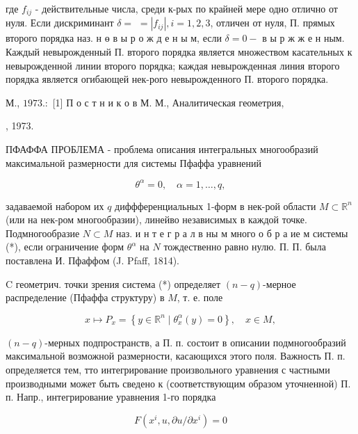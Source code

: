 \documentclass[10pt]{article}
\begin{document}
где $f_{i j}$ - действительные числа, среди к-рых по крайней мере одно отлично от нуля. Если дискриминант $\delta=$ $=\left|f_{i j}\right|, i=1,2,3$, отличен от нуля, П. прямых второго порядка наз. н ө в ы р о ж д е н ы м, если $\delta=0-$ в ы р ж ж е н ным. Каждый невырожденный П. второго порядка является множеством касательных к невырожденной линии второго порядка; каждая невырожденная линия второго порядка является огибающей нек-рого невырожденного П. второго порядка.



М., $1973 .:$ [1] П о с т н и к о в М. М., Аналитическая геометрия,



, 1973.



ПФАФФА ПРОБЛЕМА - проблема описания интегральных многообразий максимальной размерности для системы Пфаффа уравнений



\[

\theta^{\alpha}=0, \quad \alpha=1, \ldots, q,

\]



задаваемой набором их $q$ диффференциальных 1-форм в нек-рой области $M \subset \mathbb{R}^{n}$ (или на нек-ром многообразии), линейво независимых в каждой точке. Подмногообразие $N \subset M$ наз. и н т е г р а л в ны м много о б р а ие м системы (*), если ограничение форм $\theta^{\alpha}$ на $N$ тождественно равно нулю. П. П. была поставлена И. Пфаффом (J. Pfaff, 1814).



C геометрич. точки зрения система (*) определяет $(n-q)$-мерное распределение (Пфаффа структуру) в $M$, т. е. поле



\[

x \longmapsto P_{x}=\left\{y \in \mathbb{R}^{n} \mid \theta_{x}^{\alpha}(y)=0\right\}, \quad x \in M,

\]



$(n-q)$-мерных подпространств, а П. п. состоит в описании подмногообразий максимальной возможной размерности, касающихся этого поля. Важность П. п. определяется тем, тто интегрирование произвольного уравнения с частными производными может быть сведено к (соответствующим образом уточненной) П. п. Напр., интегрирование уравнения 1-го порядка



\[

F\left(x^{i}, u, \partial u / \partial x^{i}\right)=0

\]
\end{document}
